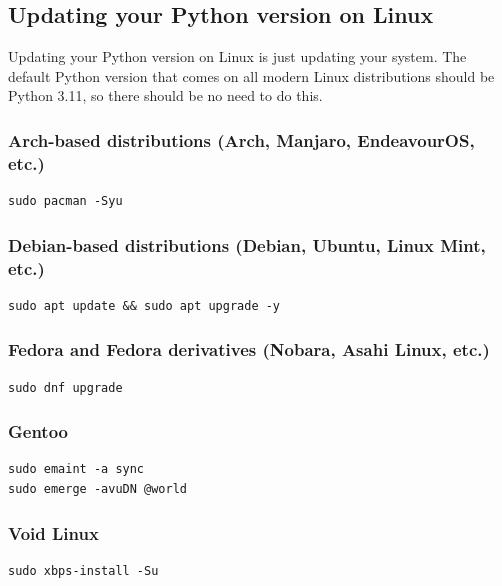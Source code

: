 \documentclass[11pt]{article}
\begin{document}
 \newpage

\subsection{Updating your Python version on Linux}
\label{sec:orgbcf36a1}
Updating your Python version on Linux is just updating your system. The default Python version that comes on all modern Linux distributions should be Python 3.11, so there should be no need to do this.

\subsubsection{Arch-based distributions (Arch, Manjaro, EndeavourOS, etc.)}
\label{sec:org86a30e1}
\begin{verbatim}
sudo pacman -Syu
\end{verbatim}

\subsubsection{Debian-based distributions (Debian, Ubuntu, Linux Mint, etc.)}
\label{sec:org3c5d4bc}
\begin{verbatim}
sudo apt update && sudo apt upgrade -y
\end{verbatim}

\subsubsection{Fedora and Fedora derivatives (Nobara, Asahi Linux, etc.)}
\label{sec:orgb46454c}
\begin{verbatim}
sudo dnf upgrade
\end{verbatim}

\subsubsection{Gentoo}
\label{sec:org0a09f72}
\begin{verbatim}
sudo emaint -a sync
sudo emerge -avuDN @world
\end{verbatim}

\subsubsection{Void Linux}
\label{sec:org1a2bc63}
\begin{verbatim}
sudo xbps-install -Su
\end{verbatim}
\end{document}
